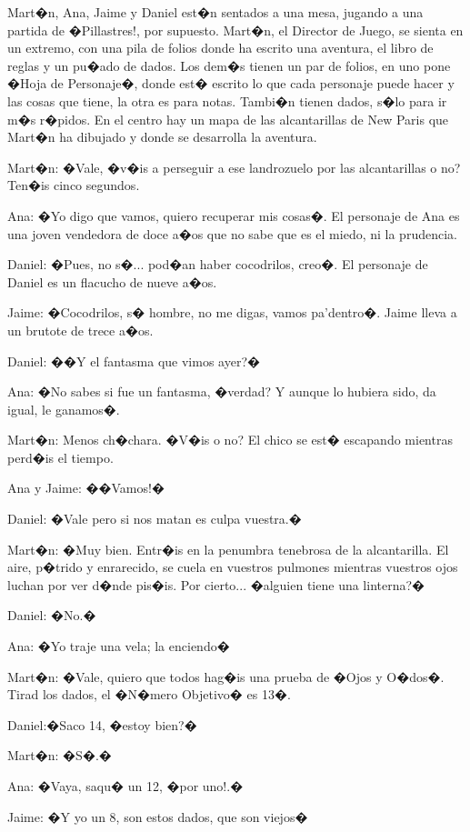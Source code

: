 Mart�n, Ana, Jaime y Daniel est�n sentados a una mesa, jugando a una partida de �Pillastres!, por supuesto. Mart�n, el Director de Juego, se sienta en un extremo, con una pila de folios donde ha escrito una aventura, el libro de reglas y un pu�ado de dados. Los dem�s tienen un par de folios, en uno pone �Hoja de Personaje�, donde est� escrito lo que cada personaje puede hacer y las cosas que tiene, la otra es para notas. Tambi�n tienen dados, s�lo para ir m�s r�pidos. En el centro hay un mapa de las alcantarillas de New Paris que Mart�n ha dibujado y donde se desarrolla la aventura.


Mart�n: �Vale, �v�is a perseguir a ese landrozuelo por las alcantarillas o no? Ten�is cinco segundos.


Ana: �Yo digo que vamos, quiero recuperar mis cosas�. El personaje de Ana es una joven vendedora de doce a�os que no sabe que es el miedo, ni la prudencia.


Daniel: �Pues, no s�... pod�an haber cocodrilos, creo�. El personaje de Daniel es un flacucho de nueve a�os.


Jaime: �Cocodrilos, s� hombre, no me digas, vamos pa'dentro�. Jaime lleva a un brutote de trece a�os.


Daniel: ��Y el fantasma que vimos ayer?�


Ana: �No sabes si fue un fantasma, �verdad? Y aunque lo hubiera sido, da igual, le ganamos�.


Mart�n: Menos ch�chara. �V�is o no? El chico se est� escapando mientras perd�is el tiempo.


Ana y Jaime: ��Vamos!�


Daniel: �Vale pero si nos matan es culpa vuestra.�


Mart�n: �Muy bien. Entr�is en la penumbra tenebrosa de la alcantarilla. El aire, p�trido y enrarecido, se cuela en vuestros pulmones mientras vuestros ojos luchan por ver d�nde pis�is. Por cierto... �alguien tiene una linterna?�


Daniel: �No.�


Ana: �Yo traje una vela; la enciendo�


Mart�n: �Vale, quiero que todos hag�is una prueba de �Ojos y O�dos�. Tirad los dados, el �N�mero Objetivo� es 13�.


Daniel:�Saco 14, �estoy bien?�


Mart�n: �S�.�


Ana: �Vaya, saqu� un 12, �por uno!.�


Jaime: �Y yo un 8, son estos dados, que son viejos�


